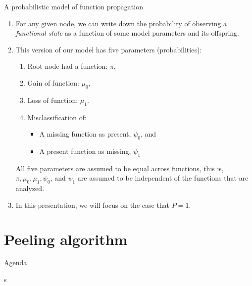 \documentclass[9pt,handout,ignorenonframetext,]{beamer}
\providecommand{\tightlist}{%
  \setlength{\itemsep}{0pt}\setlength{\parskip}{0pt}}
\begin{document}
\begin{frame}{A probabilistic model of function propagation}

\begin{enumerate}
\def\labelenumi{\arabic{enumi}.}
\item
  For any given node, we can write down the probability of observing a
  \emph{functional state} as a function of some model parameters and its
  offspring. \pause
\item
  This version of our model has five parameters (probabilities): \pause

  \begin{enumerate}
  \def\labelenumii{\alph{enumii}.}
  \tightlist
  \item
    Root node had a function: \(\pi\),
  \item
    Gain of function: \(\mu_0\),
  \item
    Loss of function: \(\mu_1\).
  \item
    Misclassification of:

    \begin{itemize}
    \tightlist
    \item
      A missing function as present, \(\psi_0\), and
    \item
      A present function as missing, \(\psi_1\) \pause
    \end{itemize}
  \end{enumerate}

  All five parameters are assumed to be equal across functions, this is,
  \(\pi, \mu_0, \mu_1, \psi_0\), and \(\psi_1\) are assumed to be
  independent of the functions that are analyzed.\pause
\item
  In this presentation, we will focus on the case that \(P = 1\).
\end{enumerate}

\end{frame}

\section{Peeling algorithm}\label{peeling-algorithm}

\begin{frame}[t]{Agenda}

\tableofcontents[currentsection]s

\end{frame}
\end{document}
